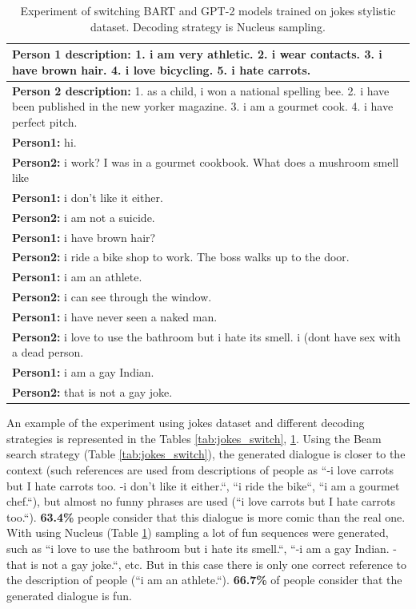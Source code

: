 \begin{table}[H]
\centering
 \begin{tabular}{|p{14cm}|} 
 \hline
 \textbf{Person 1 description:} 1. i am very athletic. 2. i wear contacts. 3. i have brown hair. 4. i love bicycling. 5. i hate carrots. \\
 \hline
 \textbf{Person 2 description:} 1. as a child, i won a national spelling bee. 2. i have been published in the new yorker magazine. 3. i am a gourmet cook. 4. i have perfect pitch. \\
 \hline
 \textbf{Person1:} hi.  \\
 \textbf{Person2:} i work? I was in a gourmet cookbook. What does a mushroom smell like \\ 
 \textbf{Person1:} i don't like it either. \\
 \textbf{Person2:} i am not a suicide.\\
 \textbf{Person1:} i have brown hair?  \\
 \textbf{Person2:} i ride a bike shop to work. The boss walks up to the door. \\
 \textbf{Person1:} i am an athlete. \\
 \textbf{Person2:} i can see through the window. \\
 \textbf{Person1:} i have never seen a naked man. \\
 \textbf{Person2:} i love to use the bathroom but i hate its smell. i (dont have sex with a dead person. \\
 \textbf{Person1:} i am a gay Indian. \\
 \textbf{Person2:} that is not a gay joke. \\
 \hline
 \end{tabular}
 \caption{Experiment of switching BART and GPT-2 models trained on jokes stylistic dataset. Decoding strategy is Nucleus sampling.}
\label{tab:jokes_switch_nucleus}
\end{table}

An example of the experiment using jokes dataset and different decoding strategies is represented in the Tables \ref{tab:jokes_switch}, \ref{tab:jokes_switch_nucleus}. Using the Beam search strategy (Table \ref{tab:jokes_switch}), the generated dialogue is closer to the context (such references are used from descriptions of people as ``-i love carrots but I hate carrots too. -i don't like it either.``, ``i ride the bike``, ``i am a gourmet chef.``), but almost no funny phrases are used (``i love carrots but I hate carrots too.``). \textbf{63.4\%} people consider that this dialogue is more comic than the real one. With using Nucleus (Table \ref{tab:jokes_switch_nucleus}) sampling a lot of fun sequences were generated, such as ``i love to use the bathroom but i hate its smell.``, ``-i am a gay Indian. -that is not a gay joke.``, etc. But in this case there is only one correct reference to the description of people (``i am an athlete.``). \textbf{66.7\%} of people consider that the generated dialogue is fun.

